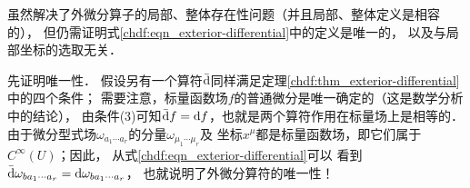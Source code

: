 虽然解决了外微分算子的局部、整体存在性问题（并且局部、整体定义是相容的），
但仍需证明式\eqref{chdf:eqn_exterior-differential}中的定义是唯一的，
以及与局部坐标的选取无关．

先证明唯一性．
假设另有一个算符$\bar{\rm d}$同样满足定理\ref{chdf:thm_exterior-differential}中的四个条件；
需要注意，标量函数场$f$的普通微分是唯一确定的（这是数学分析中的结论），
由条件(3)可知$\bar{\rm d} f = {\rm d}f$，也就是两个算符作用在标量场上是相等的．
由于微分型式场$\omega_{a_{1}\cdots a_{r}}$的分量$\omega_{\mu_{1}\cdots \mu_{r}}$及
坐标$x^{\mu}$都是标量函数场，即它们属于$C^\infty(U)$；因此，
从式\eqref{chdf:eqn_exterior-differential}可以
看到$\bar{\rm d}\omega_{b a_{1}\cdots a_{r}} = {\rm d}\omega_{b a_{1}\cdots a_{r}}$，
也就说明了外微分算符的唯一性！

